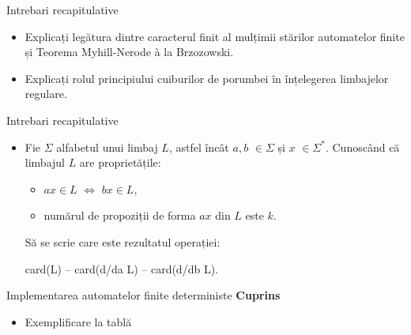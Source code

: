 \documentclass[pdf]{beamer}
\begin{document}
\begin{frame}{Intrebari recapitulative}
\begin{itemize}

\item
Explicați legătura dintre caracterul finit al mulțimii stărilor automatelor finite și Teorema Myhill-Nerode à la Brzozowski.
\newline

\item
Explicați rolul principiului cuiburilor de porumbei în înțelegerea limbajelor regulare.
\newline

\end{itemize}
\end{frame}



\begin{frame}{Intrebari recapitulative}
\begin{itemize}
\item
Fie $\Sigma$ alfabetul unui limbaj $L$, astfel încât $a, b$ $\in \Sigma$ și $x$ $\in \Sigma^{*}$. Cunoscând că limbajul $L$ are proprietățile:

\begin{itemize}
\item
$ax \in L$ $\Leftrightarrow$ $bx \in L$,

\item
numărul de propoziții de forma $ax$ din $L$ este $k$.
\end{itemize}

Să se scrie care este rezultatul operației: 

card(L) – card(d/da L) – card(d/db L).
\newline

\end{itemize}
\end{frame}






\begin{frame}{Implementarea automatelor finite deterministe}
\textbf{Cuprins}
\begin{itemize}
\item
Exemplificare la tablă
\end{itemize}
\end{frame}
\end{document}
